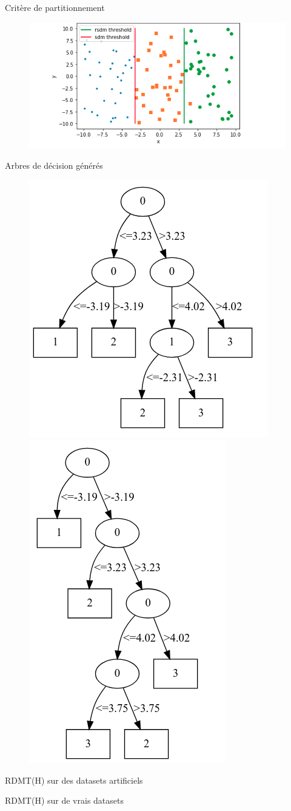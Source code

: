 \documentclass{beamer}
\begin{document}
\begin{frame}{Critère de partitionnement}
    \begin{figure}
	    \includegraphics[width=.7\textwidth]{split.png}
    \end{figure}
\end{frame}

\begin{frame}{Arbres de décision générés}
    \begin{figure}
	    \includegraphics[width=.4\textwidth]{rsdm-tree-artificial.png}
	    \includegraphics[width=.4\textwidth]{sdm-tree-artificial.png}
    \end{figure}
\end{frame}

\begin{frame}{RDMT(H) sur des datasets artificiels}

\end{frame}

\begin{frame}{RDMT(H) sur de vrais datasets}

\end{frame}

\begin{frame}[allowframebreaks]
  \printbibliography
\end{frame}
\end{document}
